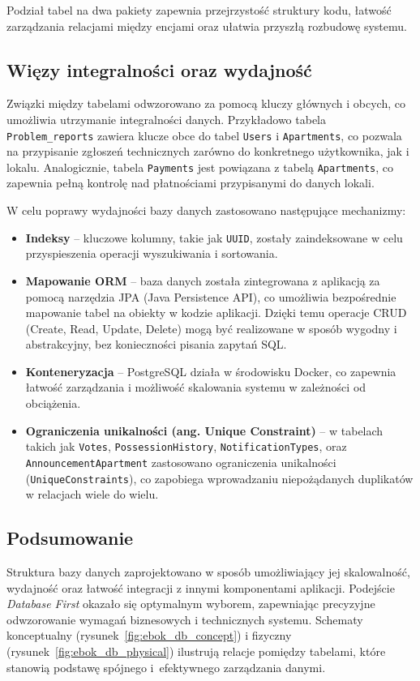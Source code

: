 Podział tabel na dwa pakiety zapewnia przejrzystość struktury kodu, łatwość zarządzania relacjami między encjami oraz ułatwia przyszłą rozbudowę systemu.


\subsection{Więzy integralności oraz wydajność}
Związki między tabelami odwzorowano za pomocą kluczy głównych i obcych, co umożliwia utrzymanie integralności danych. Przykładowo tabela \texttt{Problem\_reports} zawiera klucze obce do tabel \texttt{Users} i \texttt{Apartments}, co pozwala na przypisanie zgłoszeń technicznych zarówno do konkretnego użytkownika, jak i lokalu. Analogicznie, tabela \texttt{Payments} jest powiązana z tabelą \texttt{Apartments}, co zapewnia pełną kontrolę nad płatnościami przypisanymi do danych lokali.

W celu poprawy wydajności bazy danych zastosowano następujące mechanizmy:
\begin{itemize}
    \item \textbf{Indeksy} -- kluczowe kolumny, takie jak \texttt{UUID}, zostały zaindeksowane w celu przyspieszenia operacji wyszukiwania i sortowania.
    \item \textbf{Mapowanie ORM} -- baza danych została zintegrowana z aplikacją za pomocą narzędzia JPA (Java Persistence API), co umożliwia bezpośrednie mapowanie tabel na obiekty w kodzie aplikacji. Dzięki temu operacje CRUD (Create, Read, Update, Delete) mogą być realizowane w sposób wygodny i abstrakcyjny, bez konieczności pisania zapytań SQL.
    \item \textbf{Konteneryzacja} -- PostgreSQL działa w środowisku Docker, co zapewnia łatwość zarządzania i możliwość skalowania systemu w zależności od obciążenia.
		\item \textbf{Ograniczenia unikalności (ang. Unique Constraint)} -- w tabelach takich jak \texttt{Votes}, \texttt{PossessionHistory}, \texttt{NotificationTypes}, oraz \texttt{AnnouncementApartment} zastosowano ograniczenia unikalności (\texttt{UniqueConstraints}), co zapobiega wprowadzaniu niepożądanych duplikatów w relacjach wiele do wielu.
\end{itemize}

\subsection{Podsumowanie}

Struktura bazy danych zaprojektowano w sposób umożliwiający jej skalowalność, wydajność oraz łatwość integracji z innymi komponentami aplikacji. Podejście \emph{Database First} okazało się optymalnym wyborem, zapewniając precyzyjne odwzorowanie wymagań biznesowych i technicznych systemu. Schematy konceptualny (rysunek~\ref{fig:ebok_db_concept}) i fizyczny (rysunek~\ref{fig:ebok_db_physical}) ilustrują relacje pomiędzy tabelami, które stanowią podstawę spójnego i~efektywnego zarządzania danymi.

